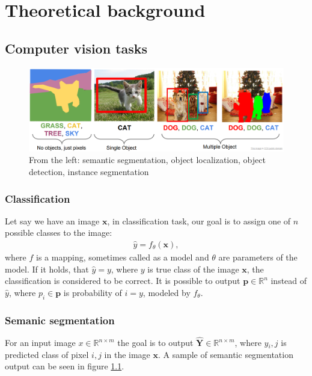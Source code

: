 \chapter{Theoretical background}
\section{Computer vision tasks}
\begin{figure}
    \centering
    \includegraphics[width=\linewidth]{images/computer_vision_tasks.png}
    \caption{From the left: semantic segmentation, object localization, object detection, instance segmentation}
    \label{fig:computer_vision_tasks}
\end{figure}
\subsection{Classification}
Let say we have an image $\mathbf{x}$, in classification task, our goal is to assign one of $n$ possible classes to the image:
\begin{align}
    \hat{y} = f_\theta\left(\mathbf{x} \right),
\end{align}
where $f$ is a mapping, sometimes called as a model and $\theta$ are parameters of the model. If it holds, that $\hat{y}=y$, where $y$ is true class of the image $\mathbf{x}$, the classification is considered to be correct.
It is possible to output $\mathbf{p} \in \mathbb{R}^n$ instead of $\hat{y}$, where $p_i \in \mathbf{p}$ is probability of $i = y$, modeled by $f_\theta$.

\subsection{Semanic segmentation}
For an input image $x \in \mathbb{R}^{n \times m}$ the goal is to output $\mathbf{\hat{Y}} \in \mathbb{R}^{n \times m}$, where $y{_i,j}$ is predicted class of pixel $i,j$ in the image $\mathbf{x}$. A sample of semantic segmentation output can be seen in figure \ref{fig:computer_vision_tasks}.

